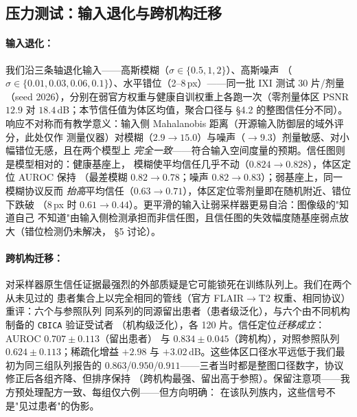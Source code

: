 \documentclass[11pt]{article}
\newcommand{\TrustMap}{信任图}
\begin{document}
\subsection{压力测试：输入退化与跨机构迁移}
\label{sec:exp-stress}
\paragraph{输入退化：}
我们沿三条轴退化输入——高斯模糊（$\sigma\in\{0.5,1,2\}$）、高斯噪声
（$\sigma\in\{0.01,0.03,0.06,0.1\}$）、水平错位（2--8\,px）——同一批 IXI 测试 30 片/剂量
（seed 2026），分别在弱官方权重与健康自训权重上各跑一次（零剂量体区 PSNR
$12.9$ 对 $18.4$\,dB；本节信任值为体区均值，聚合口径与 \S4.2 的整图信任分不同）。
响应不对称而有教学意义：输入侧 Mahalanobis 距离（开源输入防御层的域外评分，此处仅作
测量仪器）对模糊（$2.9\to15.0$）与噪声（$\to9.3$）剂量敏感、对小幅错位无感，且在两个模型上
\emph{完全一致}——符合输入空间度量的预期。\TrustMap{}则是模型相对的：健康基座上，
模糊使平均信任几乎不动（$0.824\to0.828$），体区定位 AUROC 保持
（最差模糊 $0.82\to0.78$；噪声 $0.82\to0.83$）；弱基座上，同一模糊协议反而
\emph{抬高}平均信任（$0.63\to0.71$），体区定位零剂量即在随机附近、错位下跌破
（8\,px 时 $0.61\to0.44$）。更平滑的输入让弱采样器更易自洽：图像级的"知道自己
不知道"由输入侧检测承担而非信任图，且信任图的失效幅度随基座弱点放大（错位检测仍未解决，
\S5 讨论）。
\paragraph{跨机构迁移：}
对采样器原生信任证据最强烈的外部质疑是它可能锁死在训练队列上。我们在两个从未见过的
患者集合上以完全相同的管线（官方 FLAIR$\to$T2 权重、相同协议）重评：六个与参照队列
同系列的同源留出患者（患者级泛化），与六个由不同机构制备的 \texttt{CBICA} 验证受试者
（机构级泛化），各 120 片。信任定位\emph{迁移成立}：AUROC $0.707\pm0.113$（留出患者）
与 $0.834\pm0.045$（跨机构），对照参照队列 $0.624\pm0.113$；稀疏化增益 $+2.98$ 与
$+3.02$\,dB。这些体区口径水平远低于我们最初为同三组队列报告的
$0.863$/$0.950$/$0.911$——三者当时都是整图口径数字，协议修正后各组齐降、但排序保持
（跨机构最强、留出高于参照）。保留注意项——我方预处理配方一致、每组仅六例——但方向明确：
在该队列族内，这些信号不是"见过患者"的伪影。
\end{document}
